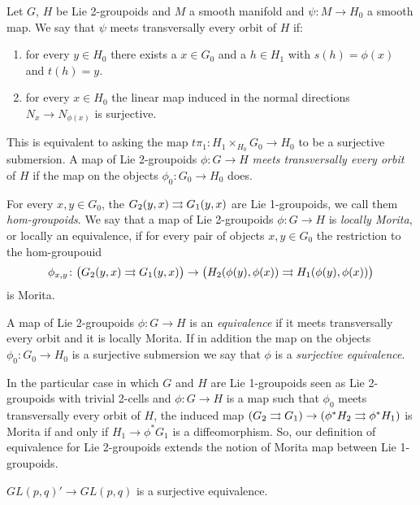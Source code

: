 Let $G$, $H$ be Lie 2-groupoids and $M$ a smooth manifold and $\psi\colon M\to H_0$ a smooth map.
We say that $\psi$ meets transversally every orbit of $H$ if:
\begin{enumerate}
  \item for every $y\in H_0$ there exists a $x\in G_0$ and a $h\in H_1$ with $s(h) = \phi(x)$ and $t(h) = y$.
  \item for every $x\in H_0$ the linear map induced in the normal directions $N_x\to N_{\phi(x)}$ is surjective.
\end{enumerate}
This is equivalent to asking the map $t\pi_1\colon H_1\times_{H_0} G_0 \to H_0$ to be a surjective submersion.
A map of Lie 2-groupoids $\phi\colon G\to H$ \emph{meets transversally every orbit} of $H$ if the map on the objects $\phi_0\colon G_0\to H_0$ does.

For every $x, y\in G_0$, the $G_2(y,x)\rightrightarrows G_1(y,x)$ are Lie 1-groupoids, we call them \emph{hom-groupoids}.
We say that a map of Lie 2-groupoids $\phi\colon G\to H$ is \emph{locally Morita}, or locally an equivalence, if for every pair of objects $x, y\in G_0$ the restriction to the hom-groupouid
\[ \phi_{x,y}\colon \big( G_2(y,x)\rightrightarrows G_1(y,x) \big) \to \big( H_2(\phi(y),\phi(x))\rightrightarrows H_1(\phi(y),\phi(x)) \big) \]
is Morita.

\begin{mydef}
A map of Lie 2-groupoids $\phi\colon G\to H$ is an \emph{equivalence} if it meets transversally every orbit and it is locally Morita.
If in addition the map on the objects $\phi_0\colon G_0\to H_0$ is a surjective submersion we say that $\phi$ is a \emph{surjective equivalence}.
\end{mydef}

\begin{example}
In the particular case in which $G$ and $H$ are Lie 1-groupoids seen as Lie 2-groupoids with trivial 2-cells and $\phi: G\to H$ is a map such that $\phi_0$ meets transversally every orbit of $H$, the induced map $(G_2\rightrightarrows G_1)\to (\phi^*H_2\rightrightarrows \phi^*H_1)$ is Morita if and only if $H_1\to \phi^*G_1$ is a diffeomorphism.
So, our definition of equivalence for Lie 2-groupoids extends the notion of Morita map between Lie 1-groupoids.
\end{example}

\begin{example}

\end{example}

\begin{lemma}
$GL(p,q)' \to GL(p,q)$ is a surjective equivalence.
\end{lemma}

